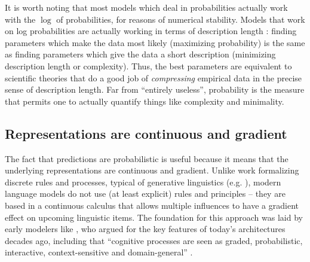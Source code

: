 \documentclass[output=paper,colorlinks,citecolor=brown]{langscibook}
\begin{document}
It is worth noting that most models which deal in probabilities actually work with the $\log$ of probabilities, for reasons of numerical stability. Models that work on log probabilities are actually working in terms of description length \citep{shannon1948mathematical,cover1999elements}: finding parameters which make the data most likely (maximizing probability) is the same as finding parameters which give the data a short description (minimizing description length or complexity). Thus, the best parameters are equivalent to scientific theories that do a good job of \textit{compressing} empirical data in the precise sense of description length. Far from ``entirely useless'', probability is the measure that permits one to actually quantify things like complexity and minimality. 

\subsection{Representations are continuous and gradient}

The fact that predictions are probabilistic is useful because it means that the underlying representations are continuous and gradient. Unlike work formalizing discrete rules and processes, typical of generative linguistics (e.g. \citealt{chomsky1956three,chomsky1995minimalist,collins2016formalization,chomsky1957syntactic,pinker1988language}), modern language models do not use (at least explicit) rules and principles -- they are based in a continuous calculus that allows multiple influences to have a gradient effect on upcoming linguistic items. The foundation for this approach was laid by early modelers like \citet{rumelhart1986learning}, who argued for the key features of today's architectures decades ago, including that ``cognitive processes are seen as graded, probabilistic, interactive, context-sensitive and domain-general'' \citep{mcclelland2002rules}.
\end{document}
